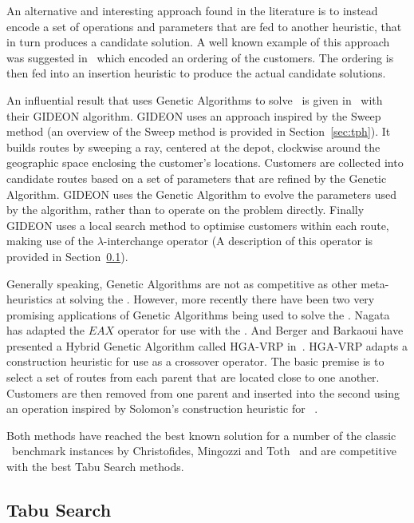 An alternative and interesting approach found in the literature is to instead encode a set of operations and parameters that are fed to another heuristic, that in turn produces a candidate solution. A well known example of this approach was suggested in~\cite{BW:1993} which encoded an ordering of the customers. The ordering is then fed into an insertion heuristic to produce the actual candidate solutions.

An influential result that uses Genetic Algorithms to solve \VRPTW\ is given in~\cite{TNJ:1991} with their GIDEON algorithm. GIDEON uses an approach inspired by the Sweep method (an overview of the Sweep method is provided in Section~\ref{sec:tph}). It builds routes by sweeping a ray, centered at the depot, clockwise around the geographic space enclosing the customer's locations. Customers are collected into candidate routes based on a set of parameters that are refined by the Genetic Algorithm. GIDEON uses the Genetic Algorithm to evolve the parameters used by the algorithm, rather than to operate on the problem directly. Finally GIDEON uses a local search method to optimise customers within each route, making use of the $\lambda$-interchange operator (A description of this operator is provided in Section~\ref{sec:ts}).

Generally speaking, Genetic Algorithms are not as competitive as other meta-heuristics at solving the \VRP. However, more recently there have been two very promising applications of Genetic Algorithms being used to solve the \VRP. Nagata~\cite{Nagata:2007} has adapted the $EAX$ operator for use with the \VRP. And Berger and Barkaoui have presented a Hybrid Genetic Algorithm called HGA-VRP in~\cite{BM:2003}. HGA-VRP adapts a construction heuristic for use as a crossover operator. The basic premise is to select a set of routes from each parent that are located close to one another. Customers are then removed from one parent and inserted into the second using an operation inspired by Solomon's construction heuristic for \VRPTW~\cite{Solomon:1987}.

Both methods have reached the best known solution for a number of the classic \VRP\ benchmark instances by Christofides, Mingozzi and Toth~\cite{CMT:1981} and are competitive with the best Tabu Search methods.

\subsection{Tabu Search}
\label{sec:ts}

